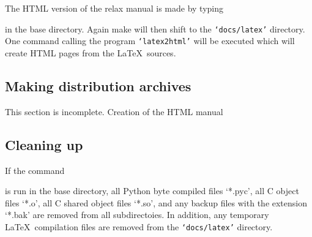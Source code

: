 The HTML version of the relax manual is made by typing


in the base directory.  Again make will then shift to the \texttt{`docs/latex'} directory.  One command calling the program \texttt{`latex2html'} will be executed which will create HTML pages from the \LaTeX\ sources.


\subsection{Making distribution archives}

This section is incomplete.
Creation of the HTML manual


\subsection{Cleaning up}

If the command


is run in the base directory, all Python byte compiled files `*.pyc', all C object files `*.o', all C shared object files `*.so', and any backup files with the extension `*.bak' are removed from all subdirectoies.  In addition, any temporary \LaTeX\ compilation files are removed from the \texttt{`docs/latex'} directory.
